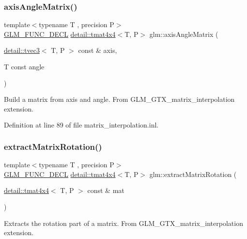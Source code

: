\subsubsection{\texorpdfstring{axis\+Angle\+Matrix()}{axisAngleMatrix()}}
{\footnotesize\ttfamily template$<$typename T , precision P$>$ \\
\hyperlink{setup_8hpp_ab2d052de21a70539923e9bcbf6e83a51}{G\+L\+M\+\_\+\+F\+U\+N\+C\+\_\+\+D\+E\+CL} \hyperlink{structglm_1_1detail_1_1tmat4x4}{detail\+::tmat4x4}$<$T, P$>$ glm\+::axis\+Angle\+Matrix (\begin{DoxyParamCaption}\item[{\hyperlink{structglm_1_1detail_1_1tvec3}{detail\+::tvec3}$<$ T, P $>$ const \&}]{axis,  }\item[{T const}]{angle }\end{DoxyParamCaption})}

Build a matrix from axis and angle. From G\+L\+M\+\_\+\+G\+T\+X\+\_\+matrix\+\_\+interpolation extension. 

Definition at line 89 of file matrix\+\_\+interpolation.\+inl.

\mbox{\label{group__gtx__matrix__interpolation_gacb1e3e76c1710d89a1852d87d58c021e}} 
\subsubsection{\texorpdfstring{extract\+Matrix\+Rotation()}{extractMatrixRotation()}}
{\footnotesize\ttfamily template$<$typename T , precision P$>$ \\
\hyperlink{setup_8hpp_ab2d052de21a70539923e9bcbf6e83a51}{G\+L\+M\+\_\+\+F\+U\+N\+C\+\_\+\+D\+E\+CL} \hyperlink{structglm_1_1detail_1_1tmat4x4}{detail\+::tmat4x4}$<$T, P$>$ glm\+::extract\+Matrix\+Rotation (\begin{DoxyParamCaption}\item[{\hyperlink{structglm_1_1detail_1_1tmat4x4}{detail\+::tmat4x4}$<$ T, P $>$ const \&}]{mat }\end{DoxyParamCaption})}

Extracts the rotation part of a matrix. From G\+L\+M\+\_\+\+G\+T\+X\+\_\+matrix\+\_\+interpolation extension. 

